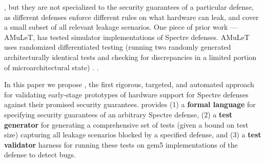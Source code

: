 , but they are not specialized to the security guarantees of a particular defense, as different defenses enforce different rules on what hardware can leak, and cover a small subset of all relevant leakage scenarios. 
One piece of prior work — AMuLeT, has tested simulator implementations of Spectre defenses. AMuLeT uses randomized differentiated testing (running two randomly generated architecturally identical tests and checking for discrepancies in a limited portion of microarchitectural state) \cite{amulet}. 
\urgentbr
{}
\notebr
{}.


In this paper we propose \toolname, the first rigorous, targeted, and automated approach for validating early-stage prototypes of hardware support for Spectre defenses against their promised security guarantees. \toolname provides (1) a \textbf{formal language} for specifying security guarantees of an arbitrary Spectre defense, (2) a \textbf{test generator} for generating a comprehensive set of tests (given a bound on test size) capturing all leakage scenarios blocked by a specified defense, and (3) a \textbf{test validator} harness for running these tests on gem5 implementations of the defense to detect bugs. 

